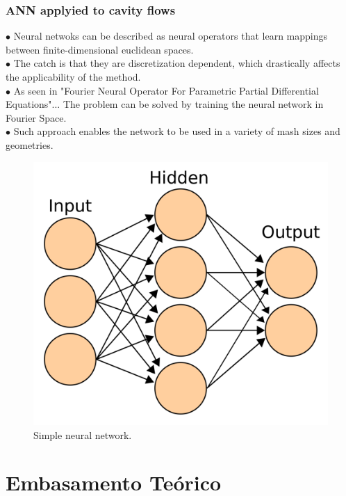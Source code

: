 \documentclass[xcolor=dvipsnames,10pt,aspectratio=169]{beamer}
\begin{document}
\begin{frame}\frametitle{ANN applyied to cavity flows}
	\begin{minipage}[h!]{0.39\textwidth}
		$\bullet$ Neural netwoks can be described as neural operators that learn mappings between finite-dimensional euclidean spaces.\\
		$\bullet$ The catch is that they are discretization dependent, which drastically affects the applicability of the method.\\
		$\bullet$ As seen in "Fourier Neural Operator For Parametric Partial Differential Equations"... The problem can be solved by training the neural network in Fourier Space.\\
		$\bullet$ Such approach enables the network to be used in a variety of mash sizes and geometries.
	\end{minipage}
	\begin{minipage}[h!]{0.6\textwidth}
		\begin{figure}[h!]
			\centering
			\includegraphics[trim = {0cm 0cm 0cm 0cm}, clip , angle=0, scale=0.18]{./my_images/neural_figure.png}
			\caption{Simple neural network.}
		\end{figure}
	\end{minipage}
\end{frame}

\section{Embasamento Teórico}
\end{document}

